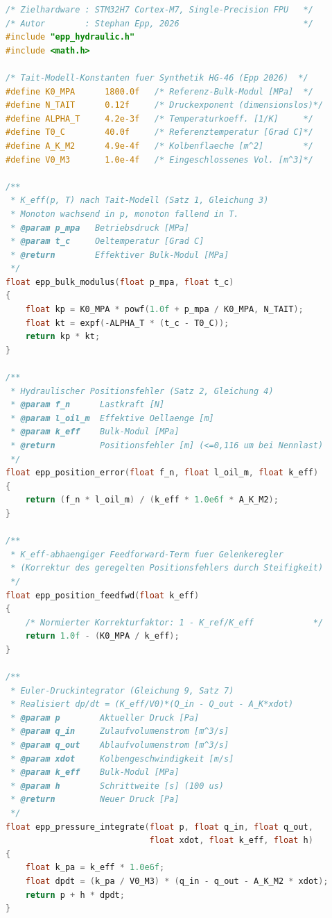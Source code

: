 ﻿\documentclass[a4paper,12pt]{scrreprt}
\theoremstyle{definition}
\begin{document}
\begin{lstlisting}[language=C,
  caption={epp\_hydraulic.c -- Tait-Bulk-Modul $K_{\text{eff}}(p,T)$,
    Positionsfehlergrenze, Euler-Druckintegrator und StabilitÃ¤tprÃ¼fung
    (Gleichungen (3), Satz~2, 7, 8 aus Abschnitt~5).},
  label={lst:epp_hydraulic}]
/* Zielhardware : STM32H7 Cortex-M7, Single-Precision FPU   */
/* Autor        : Stephan Epp, 2026                         */
#include "epp_hydraulic.h"
#include <math.h>

/* Tait-Modell-Konstanten fuer Synthetik HG-46 (Epp 2026)  */
#define K0_MPA      1800.0f   /* Referenz-Bulk-Modul [MPa]  */
#define N_TAIT      0.12f     /* Druckexponent (dimensionslos)*/
#define ALPHA_T     4.2e-3f   /* Temperaturkoeff. [1/K]     */
#define T0_C        40.0f     /* Referenztemperatur [Grad C]*/
#define A_K_M2      4.9e-4f   /* Kolbenflaeche [m^2]        */
#define V0_M3       1.0e-4f   /* Eingeschlossenes Vol. [m^3]*/

/**
 * K_eff(p, T) nach Tait-Modell (Satz 1, Gleichung 3)
 * Monoton wachsend in p, monoton fallend in T.
 * @param p_mpa   Betriebsdruck [MPa]
 * @param t_c     Oeltemperatur [Grad C]
 * @return        Effektiver Bulk-Modul [MPa]
 */
float epp_bulk_modulus(float p_mpa, float t_c)
{
    float kp = K0_MPA * powf(1.0f + p_mpa / K0_MPA, N_TAIT);
    float kt = expf(-ALPHA_T * (t_c - T0_C));
    return kp * kt;
}

/**
 * Hydraulischer Positionsfehler (Satz 2, Gleichung 4)
 * @param f_n      Lastkraft [N]
 * @param l_oil_m  Effektive Oellaenge [m]
 * @param k_eff    Bulk-Modul [MPa]
 * @return         Positionsfehler [m] (<=0,116 um bei Nennlast)
 */
float epp_position_error(float f_n, float l_oil_m, float k_eff)
{
    return (f_n * l_oil_m) / (k_eff * 1.0e6f * A_K_M2);
}

/**
 * K_eff-abhaengiger Feedforward-Term fuer Gelenkeregler
 * (Korrektur des geregelten Positionsfehlers durch Steifigkeit)
 */
float epp_position_feedfwd(float k_eff)
{
    /* Normierter Korrekturfaktor: 1 - K_ref/K_eff            */
    return 1.0f - (K0_MPA / k_eff);
}

/**
 * Euler-Druckintegrator (Gleichung 9, Satz 7)
 * Realisiert dp/dt = (K_eff/V0)*(Q_in - Q_out - A_K*xdot)
 * @param p        Aktueller Druck [Pa]
 * @param q_in     Zulaufvolumenstrom [m^3/s]
 * @param q_out    Ablaufvolumenstrom [m^3/s]
 * @param xdot     Kolbengeschwindigkeit [m/s]
 * @param k_eff    Bulk-Modul [MPa]
 * @param h        Schrittweite [s] (100 us)
 * @return         Neuer Druck [Pa]
 */
float epp_pressure_integrate(float p, float q_in, float q_out,
                             float xdot, float k_eff, float h)
{
    float k_pa = k_eff * 1.0e6f;
    float dpdt = (k_pa / V0_M3) * (q_in - q_out - A_K_M2 * xdot);
    return p + h * dpdt;
}


\end{lstlisting}
\end{document}
